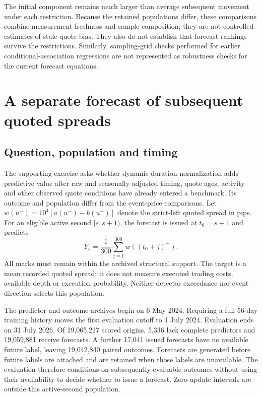 \documentclass[12pt,letterpaper]{article}
\begin{document}
The initial component remains much larger than average subsequent movement under each restriction. Because the retained populations differ, these comparisons combine measurement freshness and sample composition; they are not controlled estimates of stale-quote bias. They also do not establish that forecast rankings survive the restrictions. Similarly, sampling-grid checks performed for earlier conditional-association regressions are not represented as robustness checks for the current forecast equations.
\section{A separate forecast of subsequent quoted spreads}
\label{app:spread}

\subsection{Question, population and timing}

The supporting exercise asks whether dynamic duration normalization adds predictive value after raw and seasonally adjusted timing, quote ages, activity and other observed quote conditions have already entered a benchmark. Its outcome and population differ from the event-price comparisons. Let $w(u^-)=10^4[a(u^-)-b(u^-)]$ denote the strict-left quoted spread in pips. For an eligible active second $[s,s+1)$, the forecast is issued at $t_0=s+1$ and predicts
\begin{equation}
 Y_s=\frac{1}{300}\sum_{j=1}^{300}w((t_0+j)^-).
 \label{eq:spread-target}
\end{equation}
All marks must remain within the archived structural support. The target is a mean recorded quoted spread; it does not measure executed trading costs, available depth or execution probability. Neither detector exceedance nor event direction selects this population.

The predictor and outcome archives begin on 6 May 2024. Requiring a full 56-day training history moves the first evaluation cutoff to 1 July 2024. Evaluation ends on 31 July 2026. Of 19,065,217 scored origins, 5,336 lack complete predictors and 19,059,881 receive forecasts. A further 17,041 issued forecasts have no available future label, leaving 19,042,840 paired outcomes. Forecasts are generated before future labels are attached and are retained when those labels are unavailable. The evaluation therefore conditions on subsequently evaluable outcomes without using their availability to decide whether to issue a forecast. Zero-update intervals are outside this active-second population.
\end{document}

